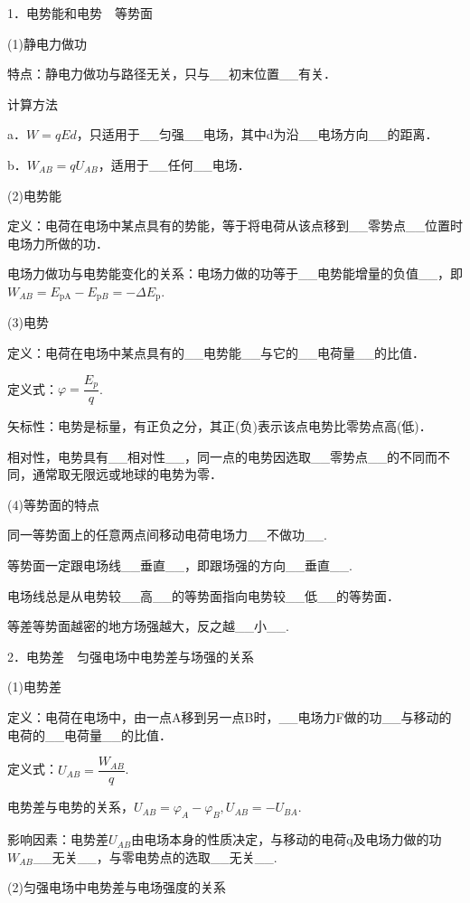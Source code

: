 \documentclass[cn,10.5pt,chinese,mac,chinesefont=founder]{elegantbook}
\begin{document}
1．电势能和电势　等势面

(1)静电力做功

特点：静电力做功与路径无关，只与\_\_初末位置\_\_有关．

计算方法

a．$W=qEd$，只适用于\_\_匀强\_\_电场，其中d为沿\_\_电场方向\_\_的距离．

b．$W_{A B}=q U_{A B}$，适用于\_\_任何\_\_电场．

(2)电势能

定义：电荷在电场中某点具有的势能，等于将电荷从该点移到\_\_零势点\_\_位置时电场力所做的功．

电场力做功与电势能变化的关系：电场力做的功等于\_\_电势能增量的负值\_\_，即$W_{A B}=E_{\mathrm{pA}}-E_{\mathrm{p} B}=-\Delta E_{\mathrm{p}}$.

(3)电势

定义：电荷在电场中某点具有的\_\_电势能\_\_与它的\_\_电荷量\_\_的比值．

定义式：$\varphi=\dfrac{E_{p}}{q}$.

矢标性：电势是标量，有正负之分，其正(负)表示该点电势比零势点高(低)．

相对性，电势具有\_\_相对性\_\_，同一点的电势因选取\_\_零势点\_\_的不同而不同，通常取无限远或地球的电势为零．

(4)等势面的特点

同一等势面上的任意两点间移动电荷电场力\_\_不做功\_\_.

等势面一定跟电场线\_\_垂直\_\_，即跟场强的方向\_\_垂直\_\_.

电场线总是从电势较\_\_高\_\_的等势面指向电势较\_\_低\_\_的等势面．

等差等势面越密的地方场强越大，反之越\_\_小\_\_.

2．电势差　匀强电场中电势差与场强的关系

(1)电势差

定义：电荷在电场中，由一点A移到另一点B时，\_\_电场力F做的功\_\_与移动的电荷的\_\_电荷量\_\_的比值．

定义式：$U_{A B}=\dfrac{W_{A B}}{q}$.

电势差与电势的关系，$U_{A B}=\varphi_{A}-\varphi_{B}, U_{A B}=-U_{B A}$.

影响因素：电势差$U_{A B}$由电场本身的性质决定，与移动的电荷q及电场力做的功$W_{AB}$\_\_无关\_\_，与零电势点的选取\_\_无关\_\_.

(2)匀强电场中电势差与电场强度的关系
\end{document}
